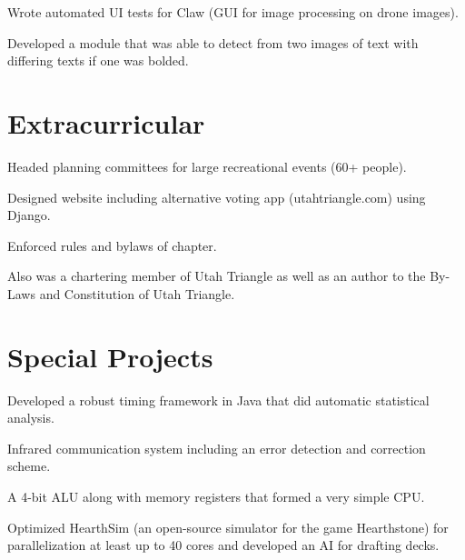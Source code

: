 \documentclass[letterpaper]{deedy-resume} %
\begin{document}
\begin{minipage}[t]{0.64\textwidth}
\sectionspace



\begin{tightitemize}
\item Wrote automated UI tests for Claw (GUI for image processing on drone images).
\item Developed a module that was able to detect from two images of text with differing texts if one was bolded.
\end{tightitemize}

\sectionspace %


\section{Extracurricular}

\begin{tightitemize}
\item Headed planning committees for large recreational events (60+ people).
\item Designed website including alternative voting app (utahtriangle.com) using Django.
\item Enforced rules and bylaws of chapter.
\item Also was a chartering member of Utah Triangle as well as an author to the By-Laws and Constitution of Utah Triangle.
\end{tightitemize}

\sectionspace %


\section{Special Projects}
\vspace{\topsep} %
\begin{tightitemize}
\item Developed a robust timing framework in Java that did automatic statistical analysis.
\item Infrared communication system including an error detection and correction scheme.
\item A 4-bit ALU along with memory registers that formed a very simple CPU.
\item Optimized HearthSim (an open-source simulator for the game Hearthstone) for parallelization at least up to 40 cores and developed an AI for drafting decks.
\end{tightitemize}


\end{minipage}
\end{document}
